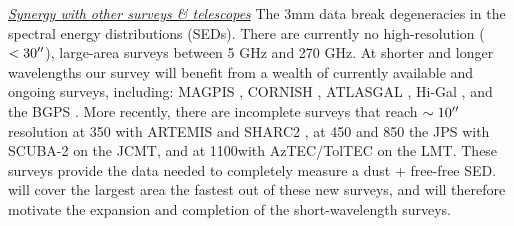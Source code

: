 \documentclass[11pt,preprint]{aastex_nofoot}
\begin{document}









\indent\underline{\textit{ Synergy with other surveys \& telescopes}} 
The 3mm data break degeneracies in the spectral energy distributions
(SEDs). There are currently no high-resolution ($<30\mbox{$^{\prime\prime}$}$), large-area
surveys between 5 GHz and 270 GHz.  At shorter and longer wavelengths our
survey will benefit from a wealth of currently available and ongoing surveys,
including: MAGPIS \citep{Helfand2006a}, CORNISH \citep{Hoare2012a}, ATLASGAL
\citep{Schuller2009a},  Hi-Gal \citep{Molinari2010a}, and the BGPS
\citep[][]{Aguirre2011a,Ginsburg2013a}.  More recently, there are incomplete
surveys that reach $\sim10\mbox{$^{\prime\prime}$}$ resolution at 350 \um with ARTEMIS and SHARC2
\citep[e.g.][]{Lin2016a}, at 450 and 850 \um the JPS with SCUBA-2 on the JCMT,
and at 1100\um with AzTEC/TolTEC on the LMT. These surveys provide the data needed to
completely measure a dust + free-free SED.   \MGPS will cover the largest area
the fastest out of these new surveys, and will therefore
motivate the expansion and completion of the short-wavelength surveys.
\end{document}
